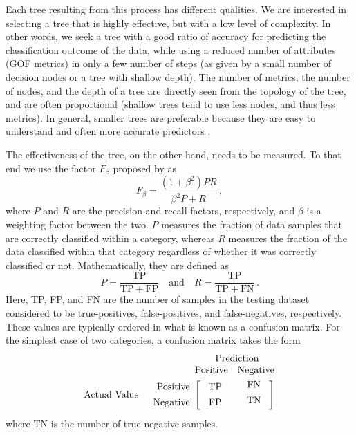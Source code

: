 Each tree resulting from this process has different qualities. We are interested in selecting a tree that is highly effective, but with a low level of complexity. In other words, we seek a tree with a good ratio of accuracy for predicting the classification outcome of the data, while using a reduced number of attributes (GOF metrics) in only a few number of steps (as given by a small number of decision nodes or a tree with shallow depth). The number of metrics, the number of nodes, and the depth of a tree are directly seen from the topology of the tree, and are often proportional (shallow trees tend to use less nodes, and thus less metrics). In general, smaller trees are preferable because they are easy to understand and often more accurate predictors \citep{Quinlan_1996_JAIR}.

The effectiveness of the tree, on the other hand, needs to be measured. To that end we use the factor $F_{\beta}$ proposed by \citet{Rijsbergen_1979_Book} as
% 
\begin{equation}
	\label{eq:f}
	F_{\beta} = \frac{ (1 + \beta^2) P R}{\beta^2 P + R}
	\, ,
\end{equation}
% 
where $P$ and $R$ are the precision and recall factors, respectively, and $\beta$ is a weighting factor between the two. $P$ measures the fraction of data samples that are correctly classified within a category, whereas $R$ measures the fraction of the data classified within that category regardless of whether it was correctly classified or not. Mathematically, they are defined as
% 
\begin{equation}
	P = \frac{ \mathrm{TP} }{ \mathrm{TP} + \mathrm{FP} } 
	\quad \mathrm{and} \quad
	R = \frac{ \mathrm{TP} }{ \mathrm{TP} + \mathrm{FN} }
	\, .
\end{equation}
% 
Here, TP, FP, and FN are the number of samples in the testing dataset considered to be true-positives, false-positives, and false-negatives, respectively. These values are typically ordered in what is known as a confusion matrix. For the simplest case of two categories, a confusion matrix takes the form
% 
\begin{equation}
\nonumber
\begin{array}{rr@{}rl}
	&					&	\multicolumn{2}{c}{\mathrm{Prediction}}		\\
	&					&	\mathrm{Positive}	&	\mathrm{Negative}	\\[0.75ex]
	\mathrm{Actual~Value}		
	&	\begin{array}{r}
			\mathrm{Positive} \\[1ex]
			\mathrm{Negative} 
		\end{array}
	&	\left[~
		\begin{array}{c}
			\mathrm{TP} \\[1ex]
			\mathrm{FP} 
		\end{array}\right.
	&
		\left.
		\begin{array}{cc}
			~\mathrm{FN} \\[1ex]
			~\mathrm{TN} \\[1ex]
		\end{array}~\right]
\end{array}
\end{equation}
% 
where TN is the number of true-negative samples.

